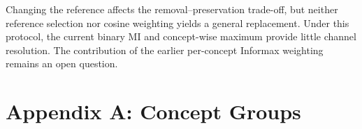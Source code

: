\documentclass[11pt]{article}
\begin{document}
Changing the reference affects the removal--preservation trade-off, but neither reference selection nor cosine weighting yields a general replacement. Under this protocol, the current binary MI and concept-wise maximum provide little channel resolution. The contribution of the earlier per-concept Informax weighting remains an open question.

\appendix
\section*{Appendix A: Concept Groups}
\begin{table}[H]
\centering
\caption{Targets and retain concepts in the reconstructed Confuse5 protocol.}
\end{table}
\end{document}
